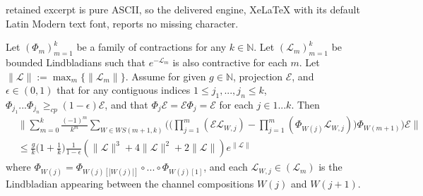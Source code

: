 \documentclass[10pt,a4paper]{amsart}
\newcommand{\E}{\mathcal{E}}
\newcommand{\NN}{\mathbb{N}}
\renewcommand{\L}{\mathcal{L}}
\begin{document}
retained excerpt is pure ASCII, so the delivered engine, XeLaTeX with its default Latin Modern text font, reports no missing character.
\begin{lemma} \label{lem:zenolem}
Let $(\Phi_m)_{m=1}^k$ be a family of contractions for any $k \in \NN$. Let $(\L_m)_{m=1}^k$ be bounded Lindbladians such that $e^{-\L_m}$ is also contractive for each $m$. Let $\|\L\| := \max_m \{\| \L_m \|\}$. Assume for given $g \in \NN$, projection $\E$, and $\epsilon \in (0,1)$ that for any contiguous indices $1 \leq j_1, ..., j_n \leq k$, $\Phi_{j_1} ... \Phi_{j_n} \geq_{cp} (1 - \epsilon) \E$, and that $\Phi_j \E = \E \Phi_j = \E$ for each $j \in 1...k$. Then
\begin{equation*}
\begin{split}
& \bigg \| \sum_{m=0}^k \frac{(-1)^m}{k^m} \sum_{W \in WS(m+1,k)} \Big ( \Big ( \prod_{j=1}^m (\E \L_{W,j})
    - \prod_{j=1}^m (\Phi_{W(j)} \L_{W,j}) \Big ) \Phi_{W(m+1)} \Big ) \E \bigg \|
\\ & \leq \frac{g}{k} \Big ( 1 + \frac{1}{k} \Big ) \frac{1}{1-\epsilon} (\|\L\|^3 + 4 \|\L\|^2 + 2 \|\L\|) e^{\|\L\|}
\end{split}
\end{equation*}
where $\Phi_{W(j)} = \Phi_{W(j)[|W(j)|]} \circ ... \circ \Phi_{W(j)[1]}$, and each $\L_{W,j} \in (\L_m)$ is the Lindbladian appearing between the channel compositions $W(j)$ and $W(j+1)$.
\end{lemma}
\end{document}
